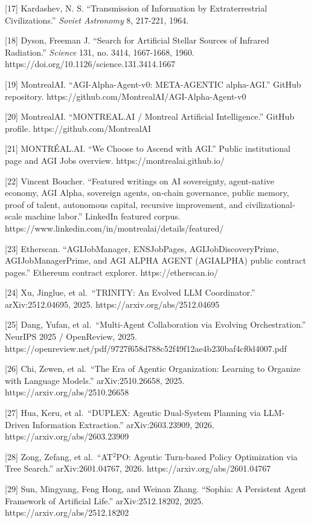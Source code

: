 \documentclass[11pt]{article}
\begin{document}
{[}17{]} Kardashev, N. S. ``Transmission of Information by
Extraterrestrial Civilizations.'' \emph{Soviet Astronomy} 8, 217-221,
1964.

{[}18{]} Dyson, Freeman J. ``Search for Artificial Stellar Sources of
Infrared Radiation.'' \emph{Science} 131, no. 3414, 1667-1668, 1960.
https://doi.org/10.1126/science.131.3414.1667

{[}19{]} MontrealAI. ``AGI-Alpha-Agent-v0: META-AGENTIC alpha-AGI.''
GitHub repository. https://github.com/MontrealAI/AGI-Alpha-Agent-v0

{[}20{]} MontrealAI. ``MONTREAL.AI / Montreal Artificial Intelligence.''
GitHub profile. https://github.com/MontrealAI

{[}21{]} MONTRÉAL.AI. ``We Choose to Ascend with AGI.'' Public
institutional page and AGI Jobs overview. https://montrealai.github.io/

{[}22{]} Vincent Boucher. ``Featured writings on AI sovereignty,
agent-native economy, AGI Alpha, sovereign agents, on-chain governance,
public memory, proof of talent, autonomous capital, recursive
improvement, and civilizational-scale machine labor.'' LinkedIn featured
corpus. https://www.linkedin.com/in/montrealai/details/featured/

{[}23{]} Etherscan. ``AGIJobManager, ENSJobPages, AGIJobDiscoveryPrime,
AGIJobManagerPrime, and AGI ALPHA AGENT (AGIALPHA) public contract
pages.'' Ethereum contract explorer. https://etherscan.io/

{[}24{]} Xu, Jinglue, et al.~``TRINITY: An Evolved LLM Coordinator.''
arXiv:2512.04695, 2025. https://arxiv.org/abs/2512.04695

{[}25{]} Dang, Yufan, et al.~``Multi-Agent Collaboration via Evolving
Orchestration.'' NeurIPS 2025 / OpenReview, 2025.
https://openreview.net/pdf/9727f658d788c52f49f12ae4b230baf4cf0d4007.pdf

{[}26{]} Chi, Zewen, et al.~``The Era of Agentic Organization: Learning
to Organize with Language Models.'' arXiv:2510.26658, 2025.
https://arxiv.org/abs/2510.26658

{[}27{]} Hua, Keru, et al.~``DUPLEX: Agentic Dual-System Planning via
LLM-Driven Information Extraction.'' arXiv:2603.23909, 2026.
https://arxiv.org/abs/2603.23909

{[}28{]} Zong, Zefang, et al.~``AT\(^2\)PO: Agentic Turn-based Policy
Optimization via Tree Search.'' arXiv:2601.04767, 2026.
https://arxiv.org/abs/2601.04767

{[}29{]} Sun, Mingyang, Feng Hong, and Weinan Zhang. ``Sophia: A
Persistent Agent Framework of Artificial Life.'' arXiv:2512.18202, 2025.
https://arxiv.org/abs/2512.18202
\end{document}

